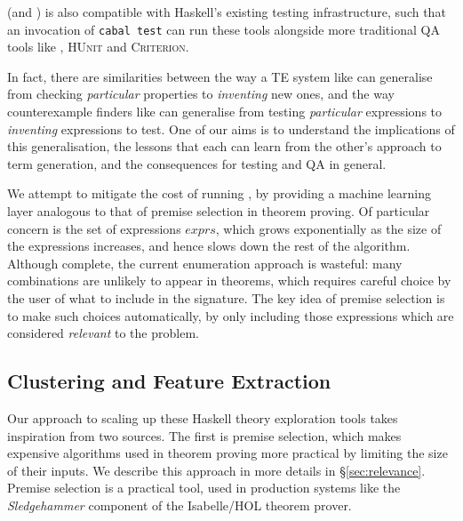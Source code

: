 \qspec{} (and \hspec{}) is also compatible with Haskell's existing testing infrastructure, such that an invocation of \texttt{cabal test} can run these tools alongside more traditional QA tools like \qcheck{}, \textsc{HUnit} and \textsc{Criterion}.

In fact, there are similarities between the way a TE system like \qspec{} can generalise from checking \emph{particular} properties to \emph{inventing} new ones, and the way counterexample finders like \qcheck{} can generalise from testing \emph{particular} expressions to \emph{inventing} expressions to test. One of our aims is to understand the implications of this generalisation, the lessons that each can learn from the other's approach to term generation, and the consequences for testing and QA in general.

We attempt to mitigate the cost of running \qspec{}, by providing a machine learning layer analogous to that of premise selection in theorem proving. Of particular concern is the set of expressions $exprs$, which grows exponentially as the size of the expressions increases, and hence slows down the rest of the algorithm. Although complete, the current enumeration approach is wasteful: many combinations are unlikely to appear in theorems, which requires careful choice by the user of what to include in the signature. The key idea of premise selection is to make such choices automatically, by only including those expressions which are considered \emph{relevant} to the problem.

\iffalse TODO: Not immediately clear how the problem of reducing the set of expressions relates to premise selection \fi
\iffalse TODO: This detailed comparison with premise selection is opaque without defining/explaining what premise selection is \fi

\subsection{Clustering and Feature Extraction}
\label{sec:featureextraction}

Our approach to scaling up these Haskell theory exploration tools takes inspiration from two sources. The first is premise selection, which makes expensive algorithms used in theorem proving more practical by limiting the size of their inputs. We describe this approach in more details in \S \ref{sec:relevance}. Premise selection is a practical tool, used in production systems like the \emph{Sledgehammer} component of the Isabelle/HOL theorem prover.

